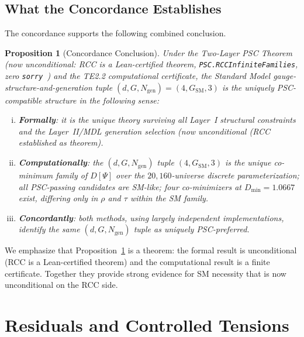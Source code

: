 \documentclass[11pt,twocolumn]{article}
\newtheorem{proposition}[theorem]{Proposition}
\theoremstyle{remark}
\begin{document}
\subsection{What the Concordance Establishes}
\label{sec:establishes}

The concordance supports the following combined conclusion.

\begin{proposition}[Concordance Conclusion]
\label{prop:concordance}
Under the Two-Layer PSC Theorem (now unconditional: RCC is a Lean-certified theorem,
\texttt{PSC.RCCInfiniteFamilies}, zero \texttt{sorry}~\cite{ugp-lean}) and the TE2.2
computational certificate, the
Standard Model gauge-structure-and-generation tuple
$(d,G,N_{\mathrm{gen}})=(4,G_{\mathrm{SM}},3)$ is the uniquely
PSC-compatible structure in the following sense:
\begin{enumerate}[(i)]
  \item \textbf{Formally}: it is the unique theory surviving all
        Layer~I structural constraints and the Layer~II/MDL
        generation selection (now unconditional (RCC established as theorem).
  \item \textbf{Computationally}: the $(d,G,N_{\mathrm{gen}})$
        tuple $(4,G_{\mathrm{SM}},3)$ is the unique co-minimum
        family of $D[\Psi]$ over the $20{,}160$-universe discrete
        parameterization; all PSC-passing candidates are SM-like;
        four co-minimizers at $D_{\min}=1.0667$ exist, differing
        only in $\rho$ and $\tau$ within the SM family.
  \item \textbf{Concordantly}: both methods, using largely
        independent implementations, identify the same
        $(d,G,N_{\mathrm{gen}})$ tuple as uniquely PSC-preferred.
\end{enumerate}
\end{proposition}

We emphasize that Proposition~\ref{prop:concordance} is a theorem:
the formal result is unconditional (RCC is a Lean-certified theorem) and
the computational result is a finite certificate.
Together they provide strong evidence for SM necessity that is
now unconditional on the RCC side.

\section{Residuals and Controlled Tensions}
\label{sec:residuals}
\end{document}
